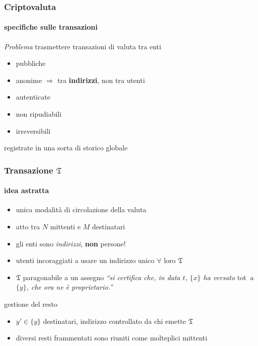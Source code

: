 \begin{frame}
	\frametitle{Criptovaluta}
	\framesubtitle{specifiche sulle transazioni}
	
	\textit{Problema}
	\newline trasmettere {\color{blue}transazioni} di valuta tra enti
	\begin{itemize}
	  \item pubbliche
	  \item anonime $\Rightarrow$ tra \textbf{indirizzi}, non tra utenti
	  \item autenticate
	  \item non ripudiabili
	  \item irreversibili
	\end{itemize}
	registrate in una sorta di {\color{blue} storico} globale
	
\end{frame}
	
\begin{frame}
	\frametitle{Transazione $\mathfrak{T}$}
	\framesubtitle{idea astratta}
	
	\begin{itemize}
	  \item unica modalità di circolazione della valuta
	  \item atto tra $N$ mittenti e $M$ destinatari
	  \item gli enti sono \textit{indirizzi}, \textbf{non} persone!
	  \item utenti incoraggiati a usare un indirizzo unico $\forall$ loro $\mathfrak{T}$
	  \item $\mathfrak{T}$ paragonabile a un {\color{blue}assegno}
	  \newline \textit{``si certifica che, in data $t$,}
	  \newline \textit{$\{x\}$ ha versato} tot \bitcoinA\,\textit{a $\{y\}$, che ora ne è proprietario.''}
	\end{itemize}
	gestione del {\color{blue}resto}
	\begin{itemize}
		\item $y'\in\{y\}$ destinatari, indirizzo controllato da chi emette $\mathfrak{T}$
		\item diversi resti frammentati sono riuniti come molteplici mittenti 
	\end{itemize}
\end{frame}
